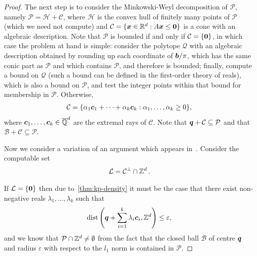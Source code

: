 \begin{proof}
The next step is to consider the Minkowski-Weyl decomposition of $\mathcal{P}$, namely $\mathcal{P} = \mathcal{H} + \mathcal{C}$, where $\mathcal{H}$ is the convex hull of finitely many points of $\mathcal{P}$ (which we need not compute) and $\mathcal{C} = \lbrace \boldsymbol{x} \in \mathbb{R}^{d}: A \boldsymbol{x} \leq \boldsymbol{0} \rbrace$ is a cone with an algebraic description.
Note that $\mathcal{P}$ is bounded if and only if $\mathcal{C} = \lbrace \boldsymbol{0} \rbrace$, in which case the problem at hand is simple: consider the polytope $\mathcal{Q}$ with an algebraic description obtained by rounding up each coordinate of $\boldsymbol{b} / \pi$, which has the same conic part as $\mathcal{P}$ and which contains $\mathcal{P}$, and therefore is bounded; finally, compute a bound on $\mathcal{Q}$ (such a bound can be defined in the first-order theory of reals), which is also a bound on $\mathcal{P}$, and test the integer points within that bound for membership in $\mathcal{P}$. Otherwise,
\begin{align*}
\mathcal{C} = \lbrace \alpha_{1} \boldsymbol{c}_{1} + \cdots + \alpha_{k} \boldsymbol{c}_{k}: \alpha_{1}, \ldots, \alpha_{k} \geq 0 \rbrace,
\end{align*}
where $\boldsymbol{c}_{1}, \ldots, \boldsymbol{c}_{k} \in \overline{\mathbb{Q}}^{d}$ are the extremal rays of $\mathcal{C}$. Note that $\boldsymbol{q} + \mathcal{C} \subseteq \mathcal{P}$ and that $\mathcal{B} + \mathcal{C} \subseteq \mathcal{P}$.

Now we consider a variation of an argument which appears in~\cite{KhachiyanP97}. Consider the computable set
\begin{align*}
{\cal{L}} = \mathcal{C}^{\perp} \cap \mathbb{Z}^{d} \, .
\end{align*}

If ${\cal{L}} = \lbrace \boldsymbol{0} \rbrace$ then due to~\cref{thm:kp-density} it must be the case that there exist non-negative reals $\lambda_{1}, \ldots, \lambda_{k}$ such that
\begin{align*}
\operatorname{dist} \left(\boldsymbol{q} + \sum\limits_{i=1}^{k} \lambda_{i} \boldsymbol{c}_{i}, \mathbb{Z}^{d} \right) \leq \varepsilon ,
\end{align*}
and we know that $\mathcal{P} \cap \mathbb{Z}^{d} \neq \emptyset$ from the fact that the closed ball $\mathcal{B}$ of centre $\boldsymbol{q}$ and radius $\varepsilon$ with respect to the $l_{1}$ norm is contained in $\mathcal{P}$.


\end{proof}
